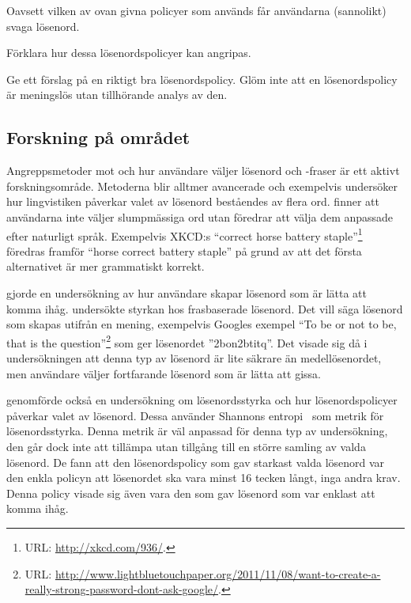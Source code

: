 Oavsett vilken av ovan givna policyer som används får användarna (sannolikt) 
svaga lösenord.

\begin{exercise}
  Förklara hur dessa lösenordspolicyer kan angripas.
\end{exercise}

\begin{exercise}
  Ge ett förslag på en riktigt bra lösenordspolicy.
  Glöm inte att en lösenordspolicy är meningslös utan tillhörande analys av 
  den.
\end{exercise}

\subsection{Forskning på området}
Angreppsmetoder mot och hur användare väljer lösenord och -fraser är ett aktivt 
forskningsområde.
Metoderna blir alltmer avancerade och exempelvis undersöker 
\citet{Bonneau2012lpo} hur lingvistiken påverkar valet av lösenord beståendes 
av flera ord.
\citeauthor{Bonneau2012lpo} finner att användarna inte väljer slumpmässiga ord 
utan föredrar att välja dem anpassade efter naturligt språk.
Exempelvis XKCD:s \enquote{correct horse battery staple}\footnote{%
  URL\@: \protect\url{http://xkcd.com/936/}.
} föredras framför \enquote{horse correct battery staple} på grund av att det 
första alternativet är mer grammatiskt korrekt.

\citet{Kuo2006hso} gjorde en undersökning av hur användare skapar lösenord som 
är lätta att komma ihåg.
\citeauthor{Kuo2006hso} undersökte styrkan hos frasbaserade lösenord.
Det vill säga lösenord som skapas utifrån en mening, exempelvis Googles exempel 
\enquote{To be or not to be, that is the question}\footnote{%
  URL\@: 
  \protect\url{http://www.lightbluetouchpaper.org/2011/11/08/want-to-create-a-really-strong-password-dont-ask-google/}.
} som ger lösenordet ''2bon2btitq''.
Det visade sig då i undersökningen att denna typ av lösenord är lite säkrare än 
medellösenordet, men användare väljer fortfarande lösenord som är lätta att 
gissa.

\citet{Komanduri2011opa} genomförde också en undersökning om lösenordsstyrka 
och hur lösenordspolicyer påverkar valet av lösenord.
Dessa använder Shannons entropi~\cite{Shannon1948amt} som metrik för 
lösenordsstyrka.
Denna metrik är väl anpassad för denna typ av undersökning, den går dock inte 
att tillämpa utan tillgång till en större samling av valda lösenord.
De fann att den lösenordspolicy som gav starkast valda lösenord var den enkla 
policyn att lösenordet ska vara minst 16 tecken långt, inga andra krav.
Denna policy visade sig även vara den som gav lösenord som var enklast att 
komma ihåg.

